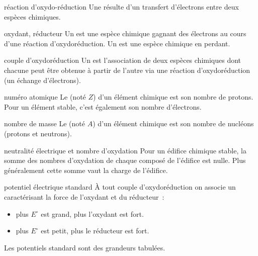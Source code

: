

\begin{adjustwidth}{-3cm}{-3cm}


\begin{definition}{9.1}{réaction d'oxydo-réduction}
    Une  résulte d'un transfert d'électrons entre deux espèces chimiques.
\end{definition}

\begin{definition}{9.2}{oxydant, réducteur}
    Un  est une espèce chimique gagnant des électrons au cours d'une réaction d'oxydoréduction. Un  est une espèce chimique en perdant.
\end{definition}

\begin{definition}{9.3}{couple d'oxydoréduction}
    Un  est l'association de deux espèces chimiques dont chacune peut être obtenue à partir de l'autre via une réaction d'oxydoréduction (\ie un échange d'électrons).
\end{definition}

\begin{definition}{9.4}{numéro atomique}
    Le  (noté $Z$) d'un élément chimique est son nombre de protons. Pour un élément stable, c'est également son nombre d'électrons.
\end{definition}

\begin{definition}{9.5}{nombre de masse}
    Le  (noté $A$) d'un élément chimique est son nombre de nucléons (protons et neutrons).
\end{definition}

\begin{proposition}{9.6}{neutralité électrique et nombre d'oxydation}
    Pour un édifice chimique stable, la somme des nombres d'oxydation de chaque composé de l'édifice est nulle.
    Plus généralement cette somme vaut la charge de l'édifice.
\end{proposition}

\newcommand{\pstand}{E^\circ}


\begin{definition}{9.7}{potentiel électrique standard}
    À tout couple d'oxydoréduction on associe un \notion{potentiel standard $\pstand$} caractérisant la force de l'oxydant et du réducteur~:
    \begin{itemize}
        \item plus $\pstand$ est grand, plus l'oxydant est fort.
        \item plus $\pstand$ est petit, plus le réducteur est fort.
    \end{itemize}
    Les potentiels standard sont des grandeurs tabulées.
\end{definition}


\end{adjustwidth}
